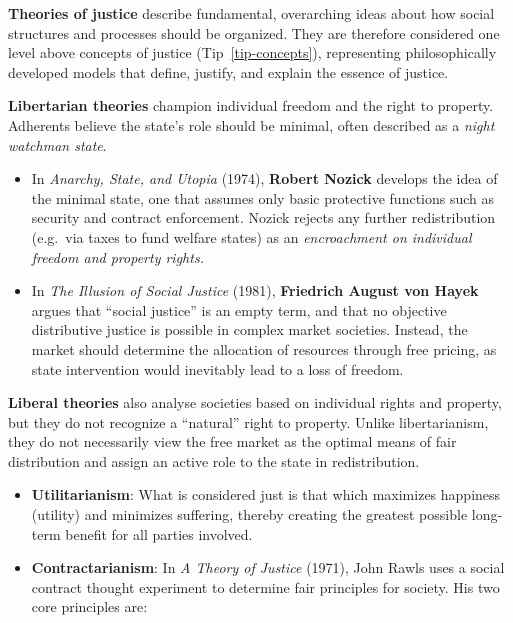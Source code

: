 \documentclass[
  a4paper,
  openany]{book}
\newcounter{quartocallouttipno}
\newcommand{\quartocallouttip}[1]{\refstepcounter{quartocallouttipno}\label{#1}}
\begin{document}
\begin{tcolorbox}[enhanced jigsaw, coltitle=black, bottomtitle=1mm, opacitybacktitle=0.6, titlerule=0mm, opacityback=0, leftrule=.75mm, colbacktitle=quarto-callout-note-color!10!white, bottomrule=.15mm, toptitle=1mm, breakable, title={Note \ref*{tip-justice}: Theories of justice}, arc=.35mm, rightrule=.15mm, toprule=.15mm, left=2mm, colback=white, colframe=quarto-callout-note-color-frame]

\quartocallouttip{tip-justice} 

\textbf{Theories of justice} describe fundamental, overarching ideas
about how social structures and processes should be organized. They are
therefore considered one level above concepts of justice
(Tip~\ref{tip-concepts}), representing philosophically developed models
that define, justify, and explain the essence of justice.

\textbf{Libertarian theories} champion individual freedom and the right
to property. Adherents believe the state's role should be minimal, often
described as a \emph{night watchman state}.

\begin{itemize}
\item
  In \emph{Anarchy, State, and Utopia} (1974), \textbf{Robert Nozick}
  develops the idea of the minimal state, one that assumes only basic
  protective functions such as security and contract enforcement. Nozick
  rejects any further redistribution (e.g.~via taxes to fund welfare
  states) as an \emph{encroachment on individual freedom and property
  rights.}
\item
  In \emph{The Illusion of Social Justice} (1981), \textbf{Friedrich
  August von Hayek} argues that ``social justice'' is an empty term, and
  that no objective distributive justice is possible in complex market
  societies. Instead, the market should determine the allocation of
  resources through free pricing, as state intervention would inevitably
  lead to a loss of freedom.
\end{itemize}

\textbf{Liberal theories} also analyse societies based on individual
rights and property, but they do not recognize a ``natural'' right to
property. Unlike libertarianism, they do not necessarily view the free
market as the optimal means of fair distribution and assign an active
role to the state in redistribution.

\begin{itemize}
\item
  \textbf{Utilitarianism}: What is considered just is that which
  maximizes happiness (utility) and minimizes suffering, thereby
  creating the greatest possible long-term benefit for all parties
  involved.
\item
  \textbf{Contractarianism}: In \emph{A Theory of Justice} (1971), John
  Rawls uses a social contract thought experiment to determine fair
  principles for society. His two core principles are:


\end{itemize}
\end{tcolorbox}
\end{document}
